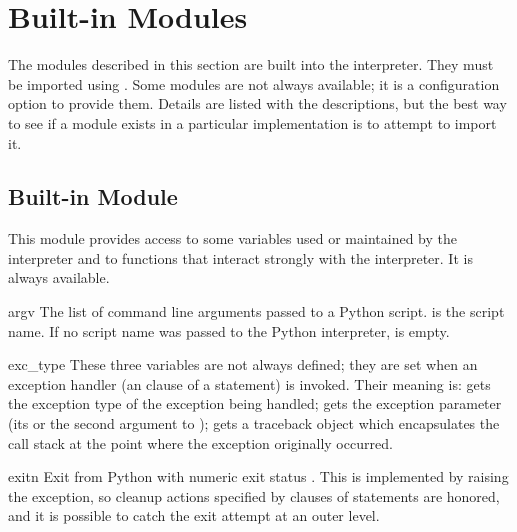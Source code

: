 \chapter{Built-in Modules}

The modules described in this section are built into the interpreter.
They must be imported using .
Some modules are not always available; it is a configuration option to
provide them.
Details are listed with the descriptions, but the best way to see if
a module exists in a particular implementation is to attempt to import
it.

\section{Built-in Module }

This module provides access to some variables used or maintained by the
interpreter and to functions that interact strongly with the interpreter.
It is always available.

\renewcommand{\indexsubitem}{(in module sys)}
\begin{datadesc}{argv}
  The list of command line arguments passed to a Python script.
   is the script name.
  If no script name was passed to the Python interpreter,
   is empty.
\end{datadesc}

\begin{datadesc}{exc_type}
  These three variables are not always defined; they are set when an
  exception handler (an  clause of a  statement) is
  invoked.  Their meaning is:  gets the exception type of
  the exception being handled;  gets the exception
  parameter (its  or the second argument to
  );  gets a traceback object which
  encapsulates the call stack at the point where the exception
  originally occurred.
\end{datadesc}

\begin{funcdesc}{exit}{n}
  Exit from Python with numeric exit status .  This is
  implemented by raising the  exception, so cleanup
  actions specified by  clauses of  statements
  are honored, and it is possible to catch the exit attempt at an outer
  level.
\end{funcdesc}

